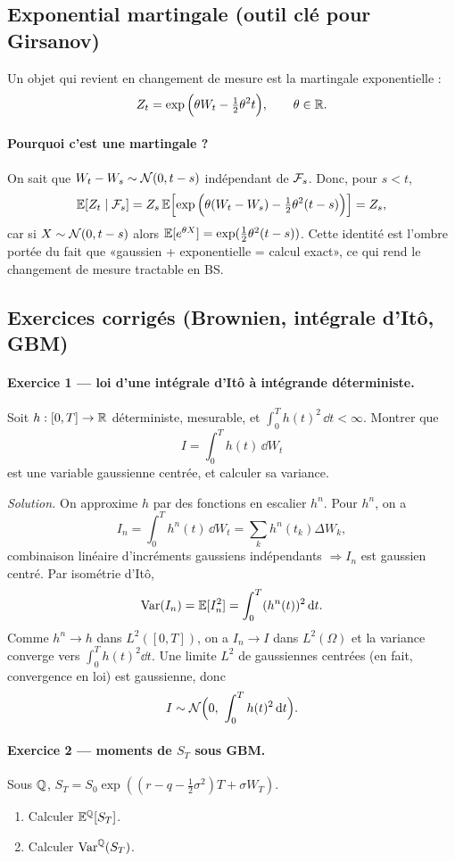 \subsection*{Exponential martingale (outil clé pour Girsanov)}
Un objet qui revient en changement de mesure est la martingale exponentielle :
\[
Z_t=\exp\Big(\theta W_t-\tfrac12\theta^2 t\Big),\qquad \theta\in\mathbb{R}.
\]
\paragraph{Pourquoi c'est une martingale ?}
On sait que $W_t-W_s\sim\mathcal{N}(0,t-s)$ indépendant de $\mathcal{F}_s$.
Donc, pour $s<t$,
\[
\mathbb{E}[Z_t\mid \mathcal{F}_s]
=Z_s\,\mathbb{E}\!\left[\exp\Big(\theta(W_t-W_s)-\tfrac12\theta^2(t-s)\Big)\right]
=Z_s,
\]
car si $X\sim\mathcal{N}(0,t-s)$ alors $\mathbb{E}[e^{\theta X}]=\exp(\tfrac12\theta^2(t-s))$.
Cette identité est l'ombre portée du fait que «gaussien + exponentielle = calcul exact», ce qui rend le changement de mesure tractable en BS.

\subsection*{Exercices corrigés (Brownien, intégrale d'Itô, GBM)}
\paragraph{Exercice 1 --- loi d'une intégrale d'Itô à intégrande déterministe.}
Soit $h:[0,T]\to\mathbb{R}$ déterministe, mesurable, et $\int_0^T h(t)^2\,\dd t<\infty$.
Montrer que
\[
I=\int_0^T h(t)\,\dd W_t
\]
est une variable gaussienne centrée, et calculer sa variance.

\emph{Solution.}
On approxime $h$ par des fonctions en escalier $h^n$.
Pour $h^n$, on a
\[
I_n=\int_0^T h^n(t)\,\dd W_t=\sum_k h^n(t_k)\Delta W_k,
\]
combinaison linéaire d'incréments gaussiens indépendants $\Rightarrow I_n$ est gaussien centré.
Par isométrie d'Itô,
\[
\mathrm{Var}(I_n)=\mathbb{E}[I_n^2]=\int_0^T (h^n(t))^2\,\mathrm{d} t.
\]
Comme $h^n\to h$ dans $L^2([0,T])$, on a $I_n\to I$ dans $L^2(\Omega)$ et la variance converge vers $\int_0^T h(t)^2\dd t$.
Une limite $L^2$ de gaussiennes centrées (en fait, convergence en loi) est gaussienne, donc
\[
I\sim \mathcal{N}\Big(0,\ \int_0^T h(t)^2\,\mathrm{d} t\Big).
\]

\paragraph{Exercice 2 --- moments de $S_T$ sous GBM.}
Sous $\mathbb{Q}$, $S_T=S_0\exp((r-q-\tfrac12\sigma^2)T+\sigma W_T)$.
\begin{enumerate}[leftmargin=*]
\item Calculer $\mathbb{E}^{\mathbb{Q}}[S_T]$.
\item Calculer $\mathrm{Var}^{\mathbb{Q}}(S_T)$.
\end{enumerate}

